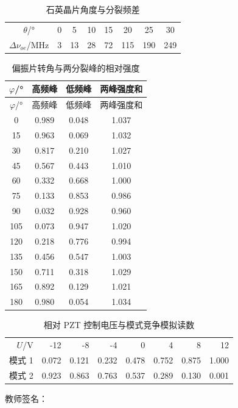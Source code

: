 \documentclass[UTF8,a4paper,10pt]{ctexart}
\newcommand{\blankfield}[1]{\makebox[#1]{\hrulefill}}
\begin{document}
\begin{table}[H]
  \centering
  \caption{石英晶片角度与分裂频差}
  \begin{tabular}{cccccccc}
    \toprule
    $\theta$/\si{\degree} & 0 & 5 & 10 & 15 & 20 & 25 & 30 \\
    $\Delta\nu_{oe}$/MHz & 3 & 13 & 28 & 72 & 115 & 190 & 249 \\
    \bottomrule
  \end{tabular}
\end{table}

\begin{longtable}{cccc}
  \caption{偏振片转角与两分裂峰的相对强度}\\
  \toprule
  $\varphi$/\si{\degree} & 高频峰 & 低频峰 & 两峰强度和 \\
  \midrule
  \endfirsthead
  \toprule
  $\varphi$/\si{\degree} & 高频峰 & 低频峰 & 两峰强度和 \\
  \midrule
  \endhead
  0   & 0.989 & 0.048 & 1.037 \\
  15  & 0.963 & 0.069 & 1.032 \\
  30  & 0.817 & 0.210 & 1.027 \\
  45  & 0.567 & 0.443 & 1.010 \\
  60  & 0.332 & 0.668 & 1.000 \\
  75  & 0.133 & 0.853 & 0.986 \\
  90  & 0.032 & 0.928 & 0.960 \\
  105 & 0.073 & 0.947 & 1.020 \\
  120 & 0.218 & 0.776 & 0.994 \\
  135 & 0.456 & 0.547 & 1.003 \\
  150 & 0.711 & 0.318 & 1.029 \\
  165 & 0.892 & 0.129 & 1.021 \\
  180 & 0.980 & 0.054 & 1.034 \\
  \bottomrule
\end{longtable}

\begin{table}[H]
  \centering
  \caption{相对 PZT 控制电压与模式竞争模拟读数}
  \begin{tabular}{rrrrrrrr}
    \toprule
    $U$/V & -12 & -8 & -4 & 0 & 4 & 8 & 12 \\
    模式 1 & 0.072 & 0.121 & 0.232 & 0.478 & 0.752 & 0.875 & 1.000 \\
    模式 2 & 0.923 & 0.863 & 0.763 & 0.537 & 0.289 & 0.130 & 0.001 \\
    \bottomrule
  \end{tabular}
\end{table}

\vspace{2em}
\noindent 教师签名：\blankfield{5cm}
\end{document}
